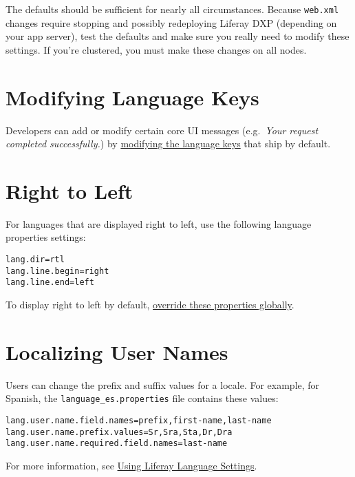 The defaults should be sufficient for nearly all circumstances. Because
\texttt{web.xml} changes require stopping and possibly redeploying
Liferay DXP (depending on your app server), test the defaults and make
sure you really need to modify these settings. If you're clustered, you
must make these changes on all nodes.

\section{Modifying Language Keys}\label{modifying-language-keys}

Developers can add or modify certain core UI messages (e.g.~\emph{Your
request completed successfully.}) by
\href{/docs/7-2/customization/-/knowledge_base/c/overriding-language-keys}{modifying
the language keys} that ship by default.

\section{Right to Left}\label{right-to-left}

For languages that are displayed right to left, use the following
language properties settings:

\begin{verbatim}
lang.dir=rtl
lang.line.begin=right
lang.line.end=left
\end{verbatim}

To display right to left by default,
\href{/docs/7-2/customization/-/knowledge_base/c/overriding-global-language-keys}{override
these properties globally}.

\section{Localizing User Names}\label{localizing-user-names}

Users can change the prefix and suffix values for a locale. For example,
for Spanish, the \texttt{language\_es.properties} file contains these
values:

\begin{verbatim}
lang.user.name.field.names=prefix,first-name,last-name
lang.user.name.prefix.values=Sr,Sra,Sta,Dr,Dra
lang.user.name.required.field.names=last-name
\end{verbatim}

For more information, see
\href{/docs/7-2/frameworks/-/knowledge_base/f/using-liferays-localization-settings}{Using
Liferay Language Settings}.

